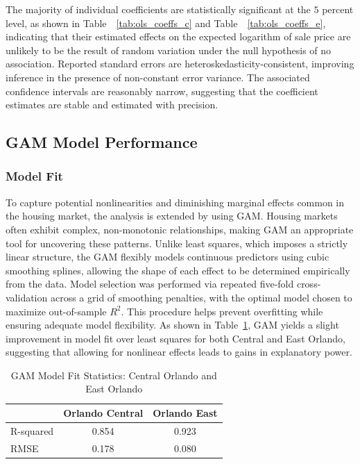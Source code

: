 


The majority of individual coefficients are statistically significant at the $5$ percent level, as shown in Table~~\ref{tab:ols_coeffs_c} and Table~~\ref{tab:ols_coeffs_e}, indicating that their estimated effects on the expected logarithm of sale price are unlikely to be the result of random variation under the null hypothesis of no association.  Reported standard errors are heteroskedasticity-consistent, improving inference in the presence of non-constant error variance. The associated confidence intervals are reasonably narrow, suggesting that the coefficient estimates are stable and estimated with precision.

\subsection*{GAM Model Performance}

\subsubsection*{Model Fit}
To capture potential nonlinearities and diminishing marginal effects common in the housing market, the analysis is extended by using GAM. Housing markets often exhibit complex, non-monotonic relationships, making GAM an appropriate tool for uncovering these patterns. Unlike least squares, which imposes a strictly linear structure, the GAM flexibly models continuous predictors using cubic smoothing splines, allowing the shape of each effect to be determined empirically from the data. Model selection was performed via repeated five-fold cross-validation across a grid of smoothing penalties, with the optimal model chosen to maximize out-of-sample $R^2$. This procedure helps prevent overfitting while ensuring adequate model flexibility. As shown in Table~\ref{tab:model_comparison_gam}, GAM yields a slight improvement in model fit over least squares for both Central and East Orlando, suggesting that allowing for nonlinear effects leads to gains in explanatory power.

\begin{table}[H]
\centering
\caption{GAM Model Fit Statistics:  Central Orlando and East Orlando}
\label{tab:model_comparison_gam}
\begin{tabular}{lcc}
\toprule
 & \textbf{Orlando Central} & \textbf{Orlando East} \\
\midrule
R-squared           & 0.854  & 0.923 \\
RMSE  & 0.178 & 0.080 \\
\bottomrule
\end{tabular}
\end{table}

